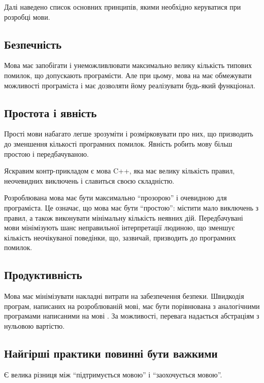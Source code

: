 \documentclass[main.tex]{subfiles}
\begin{document}
Далі наведено список основних принципів, якими необхідно керуватися при розробці мови.

\subsection{Безпечність}
Мова має запобігати і унеможливлювати максимально велику кількість типових помилок, що допускають програмісти. Але при цьому, мова на має обмежувати можливості програміста і має дозволяти йому реалізувати будь-який функціонал.

\subsection{Простота і явність}
Прості мови набагато легше зрозуміти і розмірковувати про них, що призводить до зменшення кількості програмних помилок. Явність робить мову більш простою і передбачуваною.

Яскравим контр-прикладом є мова C++, яка має велику кількість правил, неочевидних виключень і славиться своєю складністю.

Розроблювана мова має бути максимально ``прозорою'' і очевидною для програміста. Це означає, що мова має бути ``простою'': містити мало виключень з правил, а також виконувати мінімальну кількість неявних дій. Передбачувані мови мінімізують шанс неправильної інтерпретації людиною, що зменшує кількість неочікуваної поведінки, що, зазвичай, призводить до програмних помилок.

\subsection{Продуктивність}
Мова має мінімізувати накладні витрати на забезпечення безпеки. Швидкодія програм, написаних на розроблюваній мові, має бути порівнювана з аналогічними програмами написаними на мові \LangC{}.
За можливості, перевага надається абстраціям з нульовою вартістю.


\subsection{Найгірші практики повинні бути важкими}
Є велика різниця між ``підтримується мовою'' і ``заохочується мовою''.
\end{document}
